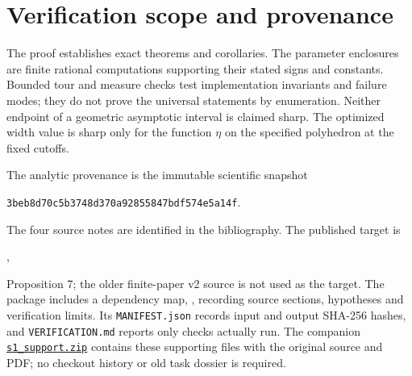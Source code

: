 \documentclass[review,supplement,hidelinks,onefignum,onetabnum]{siamart251216}
\begin{document}
\section{Verification scope and provenance}\label{sec:scope}
The proof establishes exact theorems and corollaries. The parameter
enclosures are finite rational computations supporting their stated
signs and constants. Bounded tour and measure checks test implementation
invariants and failure modes; they do not prove the universal statements
by enumeration. Neither endpoint of a geometric asymptotic interval is
claimed sharp. The optimized width value is sharp only for the function
$\eta$ on the specified polyhedron at the fixed cutoffs.

The analytic provenance is the immutable scientific snapshot
\begin{center}\small\texttt{3beb8d70c5b3748d370a92855847bdf574e5a14f}.\end{center}
The four source notes are identified in the bibliography. The published
target is\par\smallskip
{\small{}},\par\smallskip
Proposition 7; the older finite-paper v2 source is not used as the target.
The package includes a dependency map, , recording source sections,
hypotheses and verification limits. Its \texttt{MANIFEST.json} records
input and output SHA-256 hashes, and \texttt{VERIFICATION.md} reports
only checks actually run. The companion \href{s1_support.zip}{\texttt{s1\_support.zip}} contains these
supporting files with the original source and PDF; no checkout history or old task dossier is required.



\nocite{paper,terminal,stability,crossing,limit}


\end{document}
